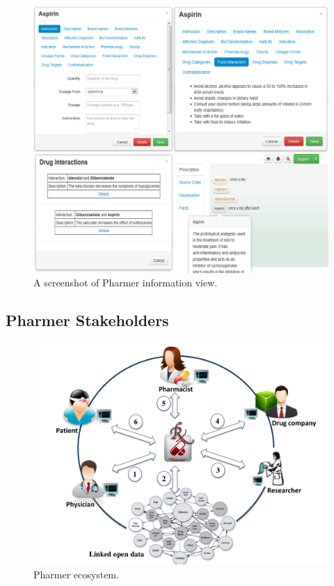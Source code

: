 \documentclass[10pt, conference, compsocconf]{IEEEtran}
\begin{document}
\begin{figure}[tb]
	\centering
		\includegraphics[width=2.0\columnwidth]{images/screenshot1.jpg}
	\caption{A screenshot of Pharmer information view.}
	\label{fig:screenshot}
\end{figure}

\subsection{Pharmer Stakeholders}
\label{sec:stake}

\begin{figure}[tb]
	\centering
		\includegraphics[width=1.0\columnwidth]{images/system.pdf}
	\caption{Pharmer ecosystem.}
	\label{fig:system}
\end{figure}
\end{document}
